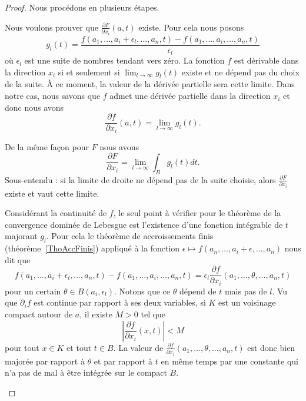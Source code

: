 \begin{proof}
	Nous procédons en plusieurs étapes.
	\begin{subproof}
		Nous voulons prouver que \( \frac{ \partial F }{ \partial x_i }(a,t)\) existe. Pour cela nous posons
		\begin{equation}
			g_l(t)=\frac{ f(a_1,\ldots, a_i+\epsilon_l,\ldots, a_n,t)-f(a_1,\ldots, a_i,\ldots, a_n,t) }{ \epsilon_l }
		\end{equation}
		où \( \epsilon_l\) est une suite de nombres tendant vers zéro. La fonction \( f\) est dérivable dans la direction \( x_i\) si et seulement si \( \lim_{l\to \infty}g_l(t) \) existe et ne dépend pas du choix de la suite. À ce moment, la valeur de la dérivée partielle sera cette limite. Dans notre cas, nous savons que \( f\) admet une dérivée partielle dans la direction \( x_i\) et donc nous avons
		\begin{equation}
			\frac{ \partial f }{ \partial x_i }(a,t)=\lim_{l\to \infty} g_l(t).
		\end{equation}

		De la même façon pour \( F\) nous avons
		\begin{equation}
			\frac{ \partial F }{ \partial x_i }=\lim_{l\to \infty} \int_{B}g_l(t)dt.
		\end{equation}
		Sous-entendu : si la limite de droite ne dépend pas de la suite choisie, alors \( \frac{ \partial F }{ \partial x_i }\) existe et vaut cette limite.

		Considérant la continuité de \( f\), le seul point à vérifier pour le théorème de la convergence dominée de Lebesgue est l'existence d'une fonction intégrable de \( t\) majorant \( g_l\). Pour cela le théorème de accroissements finis (théorème~\ref{ThoAccFinis}) appliqué à la fonction \( \epsilon\mapsto f(a_n,\ldots, a_i+\epsilon,\ldots, a_n)\) nous dit que
		\begin{equation}
			f(a_1,\ldots, a_i+\epsilon_l,\ldots, a_n,t)-f(a_1,\ldots, a_i,\ldots, a_n,t)=\epsilon_l\frac{ \partial f }{ \partial x_i }(a_1,\ldots, \theta,\ldots, a_n,t)
		\end{equation}
		pour un certain \( \theta\in B(a_i,\epsilon_l)\). Notons que ce \( \theta\) dépend de \( t\) mais pas de \( l\). Vu que \( \partial_if\) est continue par rapport à ses deux variables, si \( K\) est un voisinage compact autour de \( a\), il existe \( M>0\) tel que
		\begin{equation}    \label{EqMXqviPC}
			\left| \frac{ \partial f }{ \partial x_i }(x,t) \right| < M
		\end{equation}
		pour tout \( x\in K\) et tout \( t\in B\). La valeur de \( \frac{ \partial f }{ \partial x_i }(a_1,\ldots, \theta,\ldots, a_n,t)\) est donc bien majorée par rapport à \( \theta\) et par rapport à \( t\) en même temps par une constante qui n'a pas de mal à être intégrée sur le compact \( B\).


\end{subproof}
\end{proof}
